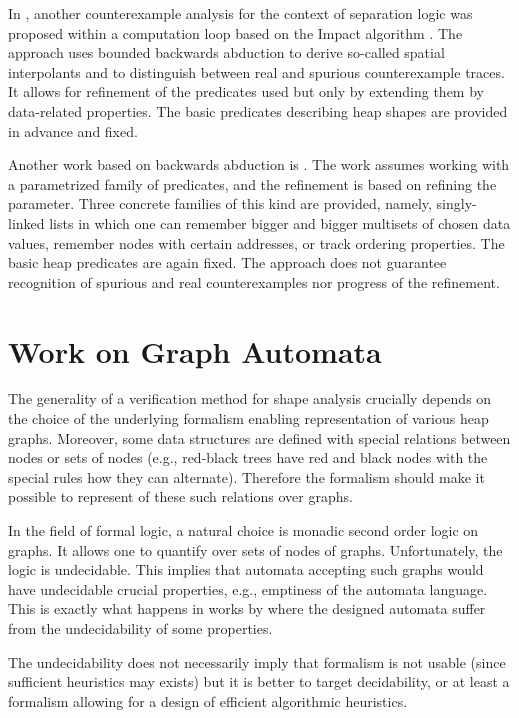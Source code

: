 	  In \cite{splinter15}, another counterexample analysis for the
	  context of separation logic was proposed within a computation loop based on the
	  Impact algorithm \cite{impact06}. The approach uses bounded backwards abduction
	  to derive so-called spatial interpolants and to distinguish between real and
	  spurious counterexample traces. It allows for refinement of the predicates used
	  but only by extending them by data-related properties. The basic predicates
	  describing heap shapes are provided in advance and fixed.
	  
	  Another work based on backwards abduction is \cite{botincan15}. The work assumes working with a
	  parametrized family of predicates, and the refinement is based on refining the
	  parameter. Three concrete families of this kind are provided, namely,
	  singly-linked lists in which one can remember bigger and bigger multisets of
	  chosen data values, remember nodes with certain addresses, or track ordering
	  properties. The basic heap predicates are again fixed. The approach does not
	  guarantee recognition of spurious and real counterexamples nor progress of the
	  refinement.

	\section{Work on Graph Automata}

	The generality of a verification method for shape analysis crucially depends on the choice
	of the underlying formalism enabling representation of various heap graphs.
	Moreover, some data structures are defined with special relations
	between nodes or sets of nodes (e.g., red-black trees have red and black nodes with
	the special rules how they can alternate).
	Therefore the formalism should make it possible to represent of these such relations over graphs.

	In the field of formal logic, a natural choice is monadic second order logic on graphs.
	It allows one to quantify over sets of nodes of graphs.
	Unfortunately, the logic is undecidable.
	This implies that automata accepting such graphs would have undecidable
	crucial properties, e.g., emptiness of the automata language.
	This is exactly what happens in works by \cite{Thomas:automata, soa-reiter15} where the designed automata
	suffer from the undecidability of some properties.

	The undecidability does not necessarily imply that formalism is not usable (since sufficient
	heuristics may exists) but it is better to target decidability, or at least a formalism
	allowing for a design of efficient algorithmic heuristics.

